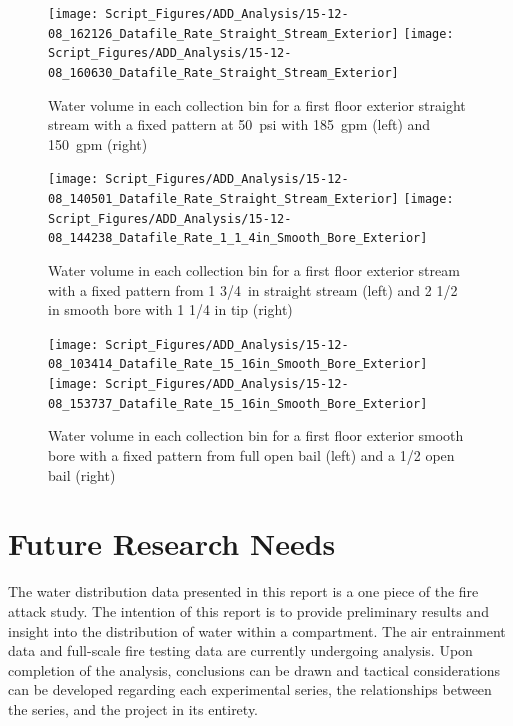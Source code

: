 \documentclass{book}
\begin{document}
\begin{figure}[ht]
\texttt{[image: Script\_Figures/ADD\_Analysis/15-12-08\_162126\_Datafile\_Rate\_Straight\_Stream\_Exterior]}
\texttt{[image: Script\_Figures/ADD\_Analysis/15-12-08\_160630\_Datafile\_Rate\_Straight\_Stream\_Exterior]} \\ 
\caption{Water volume in each collection bin for a first floor exterior straight stream with a fixed pattern at 50~psi with 185~gpm (left) and 150~gpm (right)}
\label{fig:Exterior_First_Floor_Varying_Nozzle_Pressure_SS_Fixed_Pattern}
\end{figure}

\begin{figure}[ht]
\texttt{[image: Script\_Figures/ADD\_Analysis/15-12-08\_140501\_Datafile\_Rate\_Straight\_Stream\_Exterior]}
\texttt{[image: Script\_Figures/ADD\_Analysis/15-12-08\_144238\_Datafile\_Rate\_1\_1\_4in\_Smooth\_Bore\_Exterior]} \\ 
\caption{Water volume in each collection bin for a first floor exterior stream with a fixed pattern from 1 3/4~in straight stream (left) and 2 1/2 in smooth bore with 1 1/4 in tip (right)}
\label{fig:Exterior_First_Floor_Varying_Hose_Size}
\end{figure}

\begin{figure}[ht]
\texttt{[image: Script\_Figures/ADD\_Analysis/15-12-08\_103414\_Datafile\_Rate\_15\_16in\_Smooth\_Bore\_Exterior]}
\texttt{[image: Script\_Figures/ADD\_Analysis/15-12-08\_153737\_Datafile\_Rate\_15\_16in\_Smooth\_Bore\_Exterior]} \\ 
\caption{Water volume in each collection bin for a first floor exterior smooth bore with a fixed pattern from full open bail (left) and a 1/2 open bail (right)}
\label{fig:Exterior_First_Floor_Varying_Bail}
\end{figure}



\chapter{Future Research Needs}

The water distribution data presented in this report is a one piece of the fire attack study. The intention of this report is to provide preliminary results and insight into the distribution of water within a compartment. The air entrainment data and full-scale fire testing data are currently undergoing analysis. Upon completion of the analysis, conclusions can be drawn and tactical considerations can be developed regarding each experimental series, the relationships between the series, and the project in its entirety.  
\end{document}
